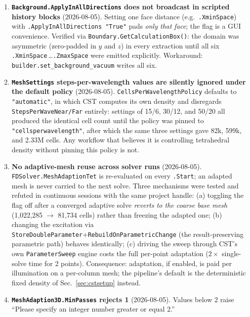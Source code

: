 \documentclass[11pt]{article}
\begin{document}
\begin{enumerate}
\item \textbf{\texttt{Background.ApplyInAllDirections} does not
broadcast in scripted history blocks} (2026-08-05).  Setting one face
distance (e.g.\ \texttt{.XminSpace}) with
\texttt{.ApplyInAllDirections "True"} pads \emph{only that face}; the
flag is a GUI convenience.  Verified via
\texttt{Boundary.GetCalculationBox()}: the domain was asymmetric
(zero-padded in $y$ and $z$) in every extraction until all six
\texttt{.XminSpace}\,\ldots\texttt{.ZmaxSpace} were emitted explicitly.
Workaround: \texttt{builder.set\_background\_vacuum} writes all six.

\item \textbf{\texttt{MeshSettings} steps-per-wavelength values are
silently ignored under the default policy} (2026-08-05).
\texttt{CellsPerWavelengthPolicy} defaults to \texttt{"automatic"}, in
which CST computes its own density and disregards
\texttt{StepsPerWaveNear/Far} entirely: settings of 15/6, 30/12, and
50/20 all produced the identical cell count until the policy was pinned
to \texttt{"cellsperwavelength"}, after which the same three settings
gave 82k, 599k, and 2.33M cells.  Any workflow that believes it is
controlling tetrahedral density without pinning this policy is not.

\item \textbf{No adaptive-mesh reuse across solver runs} (2026-08-05).
\texttt{FDSolver.MeshAdaptionTet} is re-evaluated on every
\texttt{.Start}; an adapted mesh is never carried to the next solve.
Three mechanisms were tested and refuted in continuous sessions with
the same project handle: (a) toggling the flag off after a converged
adaptive solve \emph{reverts to the coarse base mesh} (1{,}022{,}285
$\to$ 81{,}734 cells) rather than freezing the adapted one; (b)
changing the excitation via
\texttt{StoreDoubleParameter}+\texttt{RebuildOnParametricChange} (the
result-preserving parametric path) behaves identically; (c) driving the
sweep through CST's own \texttt{ParameterSweep} engine costs the full
per-point adaptation ($2\times$ single-solve time for 2 points).
Consequence: adaptation, if enabled, is paid per illumination on a
per-column mesh; the pipeline's default is the deterministic fixed
density of Sec.~\ref{sec:cstsetup} instead.

\item \textbf{\texttt{MeshAdaption3D.MinPasses} rejects 1}
(2026-08-05).  Values below 2 raise ``Please specify an integer number
greater or equal 2.''


\end{enumerate}
\end{document}

